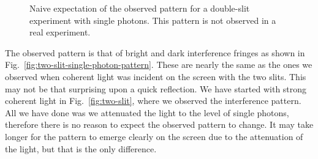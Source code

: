 \begin{figure}[H]
{
    }
    \caption[Double-slit experiment with single photons, naive expectation.]{Naive expectation of the observed pattern for a double-slit experiment with single photons. This pattern is not observed in a real experiment.}
    \label{fig:two-slit-expectation}
\end{figure}

The observed pattern is that of bright and dark interference fringes as shown in Fig.~\ref{fig:two-slit-single-photon-pattern}.
These are nearly the same as the ones we observed when coherent light was incident on the screen with the two slits.
This may not be that surprising upon a quick reflection.
We have started with strong coherent light in Fig.~\ref{fig:two-slit}, where we observed the interference pattern.
All we have done was we attenuated the light to the level of single photons, therefore there is no reason to expect the observed pattern to change.
It may take longer for the pattern to emerge clearly on the screen due to the attenuation of the light, but that is the only difference.

